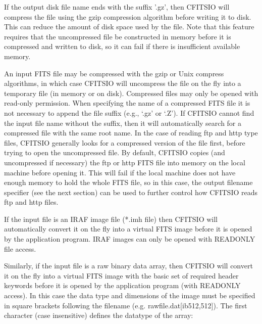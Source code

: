 \documentclass[11pt]{book}
\begin{document}
If the output disk file name ends with the suffix '.gz', then CFITSIO
will compress the file using the gzip compression algorithm before
writing it to disk.  This can reduce the amount of disk space used by
the file.  Note that this feature requires that the uncompressed file
be constructed in memory before it is compressed and written to disk,
so it can fail if there is insufficient available memory.

An input FITS file may be compressed with the gzip or Unix compress
algorithms, in which case CFITSIO will uncompress the file on the fly
into a temporary file (in memory or on disk).  Compressed files may
only be opened with read-only permission.  When specifying the name of
a compressed FITS file it is not necessary to append the file suffix
(e.g., `.gz' or `.Z').  If CFITSIO cannot find the input file name
without the suffix, then it will automatically search for a compressed
file with the same root name.  In the case of reading ftp and http type
files, CFITSIO generally looks for a compressed version of the file
first, before trying to open the uncompressed file.  By default,
CFITSIO copies (and uncompressed if necessary) the ftp or http FITS
file into memory on the local machine before opening it.  This will
fail if the local machine does not have enough memory to hold the whole
FITS file, so in this case, the output filename specifier (see the next
section) can be used to further control how CFITSIO reads ftp and http
files.

If the input file is an IRAF image file (*.imh file) then CFITSIO will
automatically convert it on the fly into a virtual FITS image before it
is opened by the application program.  IRAF images can only be opened
with READONLY file access.

Similarly, if the input file is a raw binary data array, then CFITSIO
will convert it on the fly into a virtual FITS image with the basic set
of required header keywords before it is opened by the application
program (with READONLY access).  In this case the data type and
dimensions of the image must be specified in square brackets following
the filename (e.g. rawfile.dat[ib512,512]). The first character (case
insensitive) defines the datatype of the array:
\end{document}
